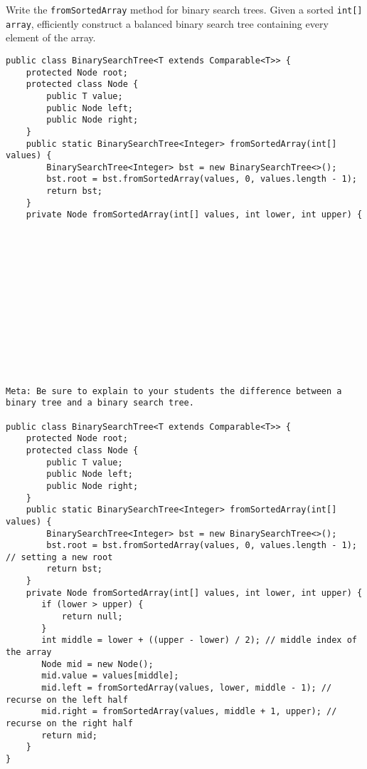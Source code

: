 \question Write the \texttt{fromSortedArray} method for binary search trees. Given a sorted \texttt{int[] array}, efficiently construct a balanced binary search tree containing every element of the array.

\ifprintanswers
\else
\begin{lstlisting}
public class BinarySearchTree<T extends Comparable<T>> {
    protected Node root;
    protected class Node {
        public T value;
        public Node left;
        public Node right;
    }
    public static BinarySearchTree<Integer> fromSortedArray(int[] values) {
        BinarySearchTree<Integer> bst = new BinarySearchTree<>();
        bst.root = bst.fromSortedArray(values, 0, values.length - 1);
        return bst;
    }
    private Node fromSortedArray(int[] values, int lower, int upper) {














\end{lstlisting}
\fi

\begin{solution}
\begin{lstlisting}
Meta: Be sure to explain to your students the difference between a binary tree and a binary search tree.

public class BinarySearchTree<T extends Comparable<T>> {
    protected Node root;
    protected class Node {
        public T value;
        public Node left;
        public Node right;
    }
    public static BinarySearchTree<Integer> fromSortedArray(int[] values) {
        BinarySearchTree<Integer> bst = new BinarySearchTree<>();
        bst.root = bst.fromSortedArray(values, 0, values.length - 1); // setting a new root
        return bst;
    }
    private Node fromSortedArray(int[] values, int lower, int upper) {
       if (lower > upper) {
           return null;
       }
       int middle = lower + ((upper - lower) / 2); // middle index of the array
       Node mid = new Node();
       mid.value = values[middle];
       mid.left = fromSortedArray(values, lower, middle - 1); // recurse on the left half
       mid.right = fromSortedArray(values, middle + 1, upper); // recurse on the right half
       return mid;
    }
}
\end{lstlisting}
\end{solution}